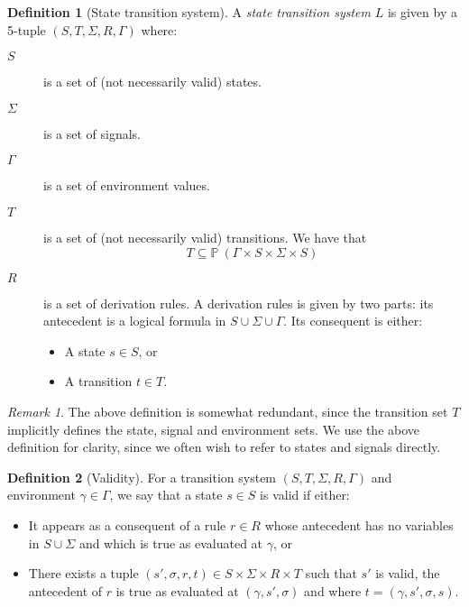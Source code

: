 \documentclass[11pt,a4paper]{article}
\newcommand{\powerset}[1]{\mathbb{P}~#1}
\theoremstyle{definition}
\newtheorem{definition}{Definition}[section]
\theoremstyle{remark}
\newtheorem{remark}{Remark}[section]
\begin{document}
\begin{definition}[State transition system]
A \textit{state transition system} $L$ is given by a 5-tuple $(S, T, \Sigma, R, \Gamma)$
where:
\begin{description}
\item[$S$] is a set of (not necessarily valid) states.
\item[$\Sigma$] is a set of signals.
\item[$\Gamma$] is a set of environment values.
\item[$T$] is a set of (not necessarily valid) transitions. We have
  that \[T\subseteq\powerset{(\Gamma\times S\times\Sigma\times S)}\]
\item[$R$] is a set of derivation rules. A derivation rules is given by two
  parts: its antecedent is a logical formula in $S\cup\Sigma\cup\Gamma$. Its
  consequent is either:
  \begin{itemize}
  \item A state $s\in S$, or
  \item A transition $t\in T$.
  \end{itemize}
\end{description}
\end{definition}
\begin{remark}
  The above definition is somewhat redundant, since the transition set $T$
  implicitly defines the state, signal and environment sets. We use the above
  definition for clarity, since we often wish to refer to states and signals directly.
\end{remark}
\begin{definition}[Validity]
  For a transition system $(S, T, \Sigma, R, \Gamma)$ and environment $\gamma\in\Gamma$, we say that a state $s\in
  S$ is valid if either:
\begin{itemize}
\item It appears as a consequent of a rule $r\in R$ whose antecedent has no
  variables in $S\cup\Sigma$ and which is true as evaluated at $\gamma$, or
\item There exists a tuple $(s', \sigma, r, t)\in S\times\Sigma\times R \times
  T$ such that $s'$ is valid, the antecedent of $r$ is true as evaluated at $(\gamma, s',
  \sigma)$ and where $t=(\gamma, s', \sigma, s)$.
\end{itemize}
\end{definition}
\end{document}
